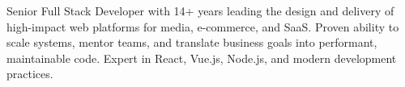 
\begin{cvparagraph}
Senior Full Stack Developer with 14+ years leading the design and delivery of high-impact web platforms for media, e-commerce, and SaaS. Proven ability to scale systems, mentor teams, and translate business goals into performant, maintainable code. Expert in React, Vue.js, Node.js, and modern development practices.
\end{cvparagraph}
